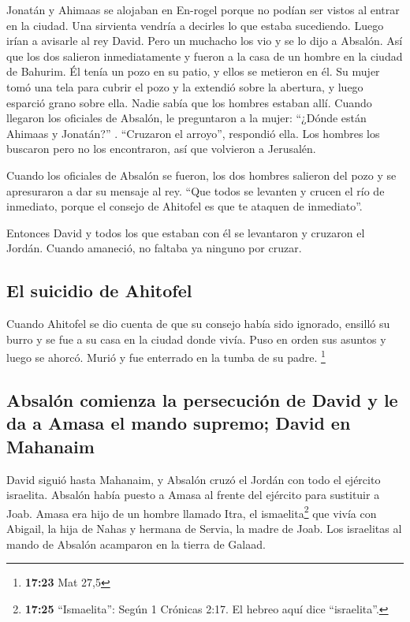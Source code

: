  Jonatán y Ahimaas se alojaban en En-rogel porque no
podían ser vistos al entrar en la ciudad. Una sirvienta vendría a
decirles lo que estaba sucediendo. Luego irían a avisarle al rey David.
 Pero un muchacho los vio y se lo dijo a Absalón. Así que
los dos salieron inmediatamente y fueron a la casa de un hombre en la
ciudad de Bahurim. Él tenía un pozo en su patio, y ellos se metieron en
él.  Su mujer tomó una tela para cubrir el pozo y la
extendió sobre la abertura, y luego esparció grano sobre ella. Nadie
sabía que los hombres estaban allí.  Cuando llegaron los
oficiales de Absalón, le preguntaron a la mujer: ``¿Dónde están Ahimaas
y Jonatán?'' . ``Cruzaron el arroyo'', respondió ella. Los hombres los
buscaron pero no los encontraron, así que volvieron a Jerusalén.

 Cuando los oficiales de Absalón se fueron, los dos
hombres salieron del pozo y se apresuraron a dar su mensaje al rey.
``Que todos se levanten y crucen el río de inmediato, porque el consejo
de Ahitofel es que te ataquen de inmediato''.

 Entonces David y todos los que estaban con él se
levantaron y cruzaron el Jordán. Cuando amaneció, no faltaba ya ninguno
por cruzar.

\hypertarget{el-suicidio-de-ahitofel}{%
\subsection{El suicidio de Ahitofel}\label{el-suicidio-de-ahitofel}}

 Cuando Ahitofel se dio cuenta de que su consejo había
sido ignorado, ensilló su burro y se fue a su casa en la ciudad donde
vivía. Puso en orden sus asuntos y luego se ahorcó. Murió y fue
enterrado en la tumba de su padre. \footnote{\textbf{17:23} Mat 27,5}

\hypertarget{absaluxf3n-comienza-la-persecuciuxf3n-de-david-y-le-da-a-amasa-el-mando-supremo-david-en-mahanaim}{%
\subsection{Absalón comienza la persecución de David y le da a Amasa el
mando supremo; David en
Mahanaim}\label{absaluxf3n-comienza-la-persecuciuxf3n-de-david-y-le-da-a-amasa-el-mando-supremo-david-en-mahanaim}}

 David siguió hasta Mahanaim, y Absalón cruzó el Jordán
con todo el ejército israelita.  Absalón había puesto a
Amasa al frente del ejército para sustituir a Joab. Amasa era hijo de un
hombre llamado Itra, el ismaelita\footnote{\textbf{17:25} ``Ismaelita'':
  Según 1 Crónicas 2:17. El hebreo aquí dice ``israelita''.} que vivía
con Abigail, la hija de Nahas y hermana de Servia, la madre de Joab.
 Los israelitas al mando de Absalón acamparon en la
tierra de Galaad.

